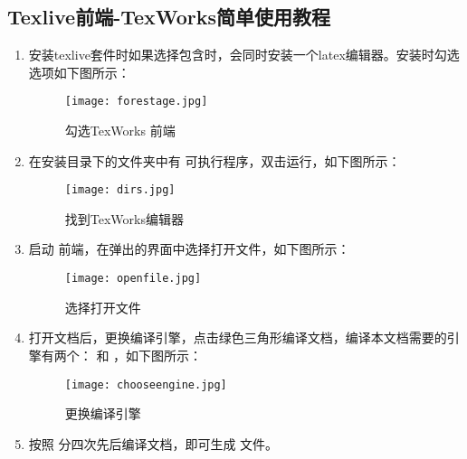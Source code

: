 \documentclass{nitthesis}
\begin{document}
\subsection{Texlive前端-TexWorks简单使用教程}

\begin{enumerate}
    \item 安装texlive套件时如果选择包含时，会同时安装一个latex编辑器。安装时勾选选项如下图所示：
    \begin{figure}[H]
        \centering
        \texttt{[image: forestage.jpg]}
        \caption{勾选TexWorks 前端}
    \end{figure}

    \item 在安装目录下的文件夹中有  可执行程序，双击运行，如下图所示：
    \begin{figure}[H]
        \centering
        \texttt{[image: dirs.jpg]}
        \caption{找到TexWorks编辑器}
    \end{figure}
    
    \item 启动  前端，在弹出的界面中选择打开文件，如下图所示：
    \begin{figure}[H]
        \centering
        \texttt{[image: openfile.jpg]}
        \caption{选择打开文件}
    \end{figure}

    \item 打开文档后，更换编译引擎，点击绿色三角形编译文档，编译本文档需要的引擎有两个： 和 ，如下图所示：
    \begin{figure}[H]
        \centering
        \texttt{[image: chooseengine.jpg]}
        \caption{更换编译引擎}
    \end{figure}

    \item 按照  分四次先后编译文档，即可生成  文件。
    
\end{enumerate}







\end{document}
